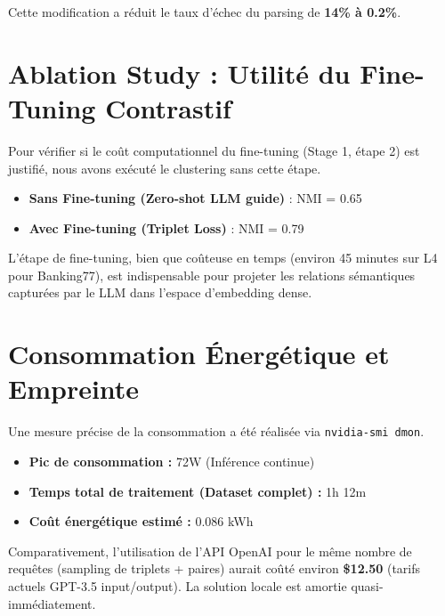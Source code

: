 \documentclass[11pt, a4paper]{article}
\begin{document}
Cette modification a réduit le taux d'échec du parsing de \textbf{14\% à 0.2\%}.

\section{Ablation Study : Utilité du Fine-Tuning Contrastif}
Pour vérifier si le coût computationnel du fine-tuning (Stage 1, étape 2) est justifié, nous avons exécuté le clustering sans cette étape.

\begin{itemize}
    \item \textbf{Sans Fine-tuning (Zero-shot LLM guide)} : NMI = 0.65
    \item \textbf{Avec Fine-tuning (Triplet Loss)} : NMI = 0.79
\end{itemize}

L'étape de fine-tuning, bien que coûteuse en temps (environ 45 minutes sur L4 pour Banking77), est indispensable pour projeter les relations sémantiques capturées par le LLM dans l'espace d'embedding dense.

\section{Consommation Énergétique et Empreinte}
Une mesure précise de la consommation a été réalisée via \texttt{nvidia-smi dmon}.

\begin{itemize}
    \item \textbf{Pic de consommation :} 72W (Inférence continue)
    \item \textbf{Temps total de traitement (Dataset complet) :} 1h 12m
    \item \textbf{Coût énergétique estimé :} 0.086 kWh
\end{itemize}

Comparativement, l'utilisation de l'API OpenAI pour le même nombre de requêtes (sampling de triplets + paires) aurait coûté environ \textbf{\$12.50} (tarifs actuels GPT-3.5 input/output). La solution locale est amortie quasi-immédiatement.

\end{document}
